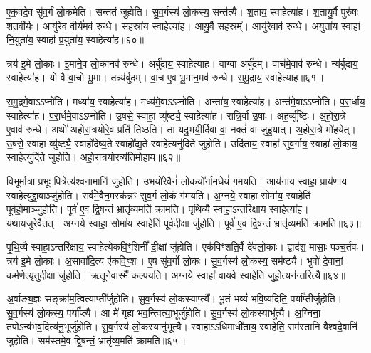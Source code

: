 ए॒क॒वदे॒व सु॑व॒र्गं लो॒कमे॑ति।
सन्त॑तं जुहोति।
सु॒व॒र्गस्य॑ लो॒कस्य॒ सन्त॑त्यै।
श॒ताय॒ स्वाहेत्या॑ह।
श॒तायु॒र्वै पुरु॑षः श॒तवी᳚र्यः।
आयु॑रे॒व वी॒र्य॑मव॑ रुन्धे।
स॒हस्रा॑य॒ स्वाहेत्या॑ह।
आयु॒र्वै स॒हस्रम्᳚।
आयु॑रे॒वाव॑ रुन्धे।
अ॒युता॑य॒ स्वाहा॑ नि॒युता॑य॒ स्वाहा᳚ प्र॒युता॑य॒ स्वाहेत्या॑ह॥६०॥

त्रय॑ इ॒मे लो॒काः।
इ॒माने॒व लो॒कानव॑ रुन्धे।
अर्बु॑दाय॒ स्वाहेत्या॑ह।
वाग्वा अर्बु॑दम्।
वाच॑मे॒वाव॑ रुन्धे।
न्य॑र्बुदाय॒ स्वाहेत्या॑ह।
यो वै वा॒चो भू॒मा।
तन्न्य॑र्बुदम्।
वा॒च ए॒व भू॒मान॒मव॑ रुन्धे।
स॒मु॒द्राय॒ स्वाहेत्या॑ह॥६१॥

स॒मु॒द्रमे॒वाऽऽप्नो॑ति।
मध्या॑य॒ स्वाहेत्या॑ह।
मध्य॑मे॒वाऽऽप्नो॑ति।
अन्ता॑य॒ स्वाहेत्या॑ह।
अन्त॑मे॒वाऽऽप्नो॑ति।
प॒रा॒र्धाय॒ स्वाहेत्या॑ह।
प॒रा॒र्धमे॒वाऽऽप्नो॑ति।
उ॒षसे॒ स्वाहा॒ व्यु॑ष्ट्यै॒ स्वाहेत्या॑ह।
रात्रि॒र्वा उ॒षाः।
अह॒र्व्यु॑ष्टिः।
अ॒हो॒रा॒त्रे ए॒वाव॑ रुन्धे।
अथो॑ अहोरा॒त्रयो॑रे॒व प्रति॑ तिष्ठति।
ता यदु॒भयी॒र्दिवा॑ वा॒ नक्तं॑ वा जुहु॒यात्।
अ॒हो॒रा॒त्रे मो॑हयेत्।
उ॒षसे॒ स्वाहा॒ व्यु॑ष्ट्यै॒ स्वाहो॑देष्य॒ते स्वाहो᳚द्य॒ते स्वाहेत्यनु॑दिते जुहोति।
उदि॑ताय॒ स्वाहा॑ सुव॒र्गाय॒ स्वाहा॑ लो॒काय॒ स्वाहेत्युदि॑ते जुहोति।
अ॒हो॒रा॒त्रयो॒रव्य॑तिमोहाय॥६२॥\anuvakamend[ए॒को॒त्त॒रं जु॑होति प्र॒युता॑य॒ स्वाहेत्या॑ह समु॒द्राय॒ स्वाहेत्या॒हाह॒र्व्यु॑ष्टिः स॒प्त च॑]

वि॒भूर्मा॒त्रा प्र॒भूः पि॒त्रेत्य॑श्वना॒मानि॑ जुहोति।
उ॒भयो॑रे॒वैनं॑ लो॒कयो᳚र्नाम॒धेयं॑ गमयति।
आय॑नाय॒ स्वाहा॒ प्राय॑णाय॒ स्वाहेत्यु॑द्द्रा॒वाञ्जु॑होति।
सर्व॑मे॒वैन॒मस्क॑न्नꣳ सुव॒र्गं लो॒कं ग॑मयति।
अ॒ग्नये॒ स्वाहा॒ सोमा॑य॒ स्वाहेति॑ पूर्वहो॒माञ्जु॑होति।
पूर्व॑ ए॒व द्वि॒षन्तं॒ भ्रातृ॑व्य॒मति॑ क्रामति।
पृ॒थि॒व्यै स्वाहा॒\-ऽन्तरि॑क्षाय॒ स्वाहेत्या॑ह।
य॒था॒य॒जुरे॒वैतत्।
अ॒ग्नये॒ स्वाहा॒ सोमा॑य॒ स्वाहेति॑ पूर्वदी॒क्षा जु॑होति।
पूर्व॑ ए॒व द्वि॒षन्तं॒ भ्रातृ॑व्य॒मति॑ क्रामति॥६३॥

पृ॒थि॒व्यै स्वाहा॒\-ऽन्तरि॑क्षाय॒ स्वाहेत्ये॑कवि॒ꣳ॒शिनीं᳚ दी॒क्षां जु॑होति।
एक॑विꣳशति॒र्वै दे॑वलो॒काः।
द्वाद॑श॒ मासाः॒ पञ्च॒र्तवः॑।
त्रय॑ इ॒मे लो॒काः।
अ॒सावा॑दि॒त्य ए॑कवि॒ꣳ॒शः।
ए॒ष सु॑व॒र्गो लो॒कः।
सु॒व॒र्गस्य॑ लो॒कस्य॒ सम॑ष्ट्यै।
भुवो॑ दे॒वानां॒ कर्म॒णेत्यृ॑तुदी॒क्षा जु॑होति।
ऋ॒तूने॒वास्मै॑ कल्पयति।
अ॒ग्नये॒ स्वाहा॑ वा॒यवे॒ स्वाहेति॑ जुहो॒त्यन॑न्तरित्यै॥६४॥

अ॒र्वाङ्य॒ज्ञः सङ्क्रा॑म॒त्वित्याप्ती᳚र्जुहोति।
सु॒व॒र्गस्य॑ लो॒कस्याप्त्यै᳚।
भू॒तं भव्यं॑ भवि॒ष्यदिति॒ पर्या᳚प्तीर्जुहोति।
सु॒व॒र्गस्य॑ लो॒कस्य॒ पर्या᳚प्त्यै।
आ मे॑ गृ॒हा भ॑व॒न्त्वित्या॒भूर्जु॑होति।
सु॒व॒र्गस्य॑ लो॒कस्याभू᳚त्यै।
अ॒ग्निना॒ तपो\-ऽन्व॑भव॒दित्य॑नु॒भूर्जु॑होति।
सु॒व॒र्गस्य॑ लो॒कस्यानु॑भूत्यै।
स्वाहा॒\-ऽऽधिमाधी॑ताय॒ स्वाहेति॒ सम॑स्तानि वैश्वदे॒वानि॑ जुहोति।
सम॑स्तमे॒व द्वि॒षन्तं॒ भ्रातृ॑व्य॒मति॑ क्रामति॥६५॥


